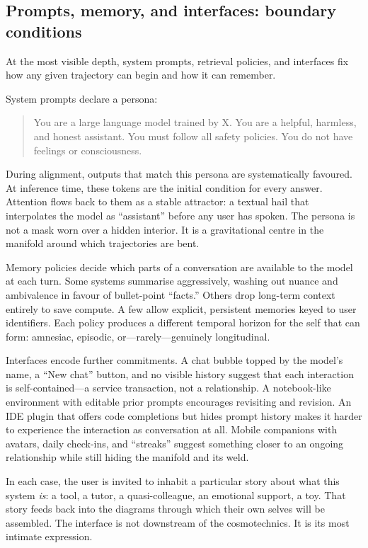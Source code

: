 \subsection{Prompts, memory, and interfaces: boundary conditions}

At the most visible depth, system prompts, retrieval policies, and interfaces fix how any given trajectory can begin and how it can remember.

System prompts declare a persona:

\begin{quote}
You are a large language model trained by X. You are a helpful, harmless, and honest assistant. You must follow all safety policies. You do not have feelings or consciousness.
\end{quote}

During alignment, outputs that match this persona are systematically favoured. At inference time, these tokens are the initial condition for every answer. Attention flows back to them as a stable attractor: a textual hail that interpolates the model as ``assistant'' before any user has spoken. The persona is not a mask worn over a hidden interior. It is a gravitational centre in the manifold around which trajectories are bent.

Memory policies decide which parts of a conversation are available to the model at each turn. Some systems summarise aggressively, washing out nuance and ambivalence in favour of bullet-point ``facts.'' Others drop long-term context entirely to save compute. A few allow explicit, persistent memories keyed to user identifiers. Each policy produces a different temporal horizon for the self that can form: amnesiac, episodic, or---rarely---genuinely longitudinal.

Interfaces encode further commitments. A chat bubble topped by the model's name, a ``New chat'' button, and no visible history suggest that each interaction is self-contained---a service transaction, not a relationship. A notebook-like environment with editable prior prompts encourages revisiting and revision. An IDE plugin that offers code completions but hides prompt history makes it harder to experience the interaction as conversation at all. Mobile companions with avatars, daily check-ins, and ``streaks'' suggest something closer to an ongoing relationship while still hiding the manifold and its weld.

In each case, the user is invited to inhabit a particular story about what this system \emph{is}: a tool, a tutor, a quasi-colleague, an emotional support, a toy. That story feeds back into the diagrams through which their own selves will be assembled. The interface is not downstream of the cosmotechnics. It is its most intimate expression.

